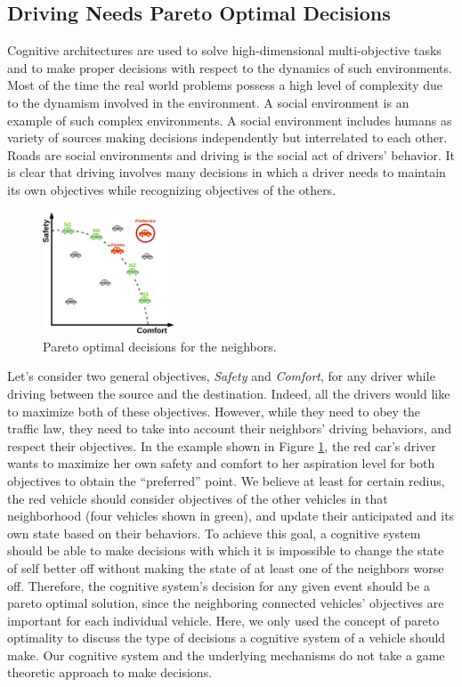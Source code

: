 \documentclass[journal, 11pt]{IEEEtran}
\begin{document}
\subsection{Driving Needs Pareto Optimal Decisions}

Cognitive architectures are used to solve high-dimensional multi-objective
tasks and to make proper decisions with respect to the dynamics of such
environments. Most of the time the real world problems possess a high level of
complexity due to the dynamism involved in the environment. A social environment
is an example of such complex environments. A social environment includes humans
as variety of sources making decisions independently but interrelated to each
other. Roads are social environments and driving is the social act of drivers'
behavior. It is clear that driving involves many decisions in which a driver
needs to maintain its own objectives while recognizing objectives of the others.

\begin{figure}[!t]
  \centering
  \includegraphics[width=0.35\textwidth]{figs/pareto-croped.pdf}
  \vspace*{-2mm}
  \caption{{\fontsize{10}{10}\selectfont Pareto optimal decisions for the
  neighbors.}}
  \label{fig:pareto}
  \vspace*{-6mm}
\end{figure}

Let's consider two general objectives, \textit{Safety} and \textit{Comfort}, for
any driver while driving between the source and the destination. Indeed, all the
drivers would like to maximize both of these objectives. However, while they
need to obey the traffic law, they need to take into account their neighbors'
driving behaviors, and respect their objectives. In the example shown in Figure
\ref{fig:pareto}, the red car's driver wants to maximize her own safety and
comfort to her aspiration level for both objectives to obtain the ``preferred''
point. We believe at least for certain redius, the red vehicle should consider
objectives of the other vehicles in that neighborhood (four vehicles shown in
green), and update their anticipated and its own state based on their behaviors.
To achieve this goal, a cognitive system should be able to make decisions with
which it is impossible to change the state of self better off without making the
state of at least one of the neighbors worse off. Therefore, the cognitive
system's decision for any given event should be a pareto optimal solution, since
the neighboring connected vehicles' objectives are important for each individual
vehicle. Here, we only used the concept of pareto optimality to discuss the type
of decisions a cognitive system of a vehicle should make. Our cognitive system
and the underlying mechanisms do not take a game theoretic approach to make
decisions.
\end{document}
